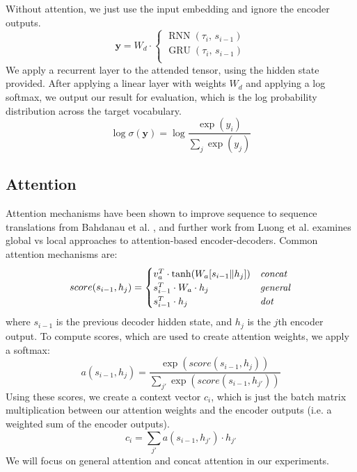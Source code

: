 \documentclass[twoside,twocolumn]{article}
\begin{document}
Without attention, we just use the input embedding and ignore the encoder
outputs.
\begin{equation}
  \mathbf{y} = W_d \cdot \begin{cases}
      \operatorname{RNN} (\tau_i, \, s_{i-1}) \\
      \operatorname{GRU} (\tau_i, \, s_{i-1}) \\
    \end{cases}
\end{equation}
We apply a recurrent layer to the attended tensor, using the hidden state
provided. After applying a linear layer with weights $W_d$ and applying a log
softmax, we output our result for evaluation, which is the log probability
distribution across the target vocabulary.
\begin{equation}
  \log \sigma(\mathbf{y}) = \log \frac{\exp(y_i)}{\sum_j \exp(y_j)}
\end{equation}
\subsection{Attention}
Attention mechanisms have been shown to improve sequence to sequence
translations from Bahdanau et al. \cite{bahdanau2014neural}, and further work
from Luong et al. \cite{luong2015effective} examines global vs local approaches
to attention-based encoder-decoders. Common attention mechanisms are:
\begin{equation}
    score(s_{i-1}, h_j) =
    \begin{cases}
        v_a^T \cdot \tanh (W_a [s_{i-1} \| h_j]) & \text{\emph{concat}} \\
        s_{i-1}^T \cdot W_a \cdot h_j & \text{\emph{general}} \\
        s_{i-1}^T \cdot h_j & \text{\emph{dot}} \\
    \end{cases}
\end{equation}
where $s_{i-1}$ is the previous decoder hidden state, and $h_j$ is the $j$th
encoder output.
To compute scores, which are used to create attention weights, we apply a
softmax:
\begin{equation}
  a(s_{i-1}, h_j) = \frac{\exp(score(s_{i-1}, h_j))}{\sum_{j'}\exp(score(s_{i-1}, h_{j'}))}
\end{equation}
Using these scores, we create a context vector $c_i$, which is just the batch
matrix multiplication between our attention weights and the encoder outputs
(i.e. a weighted sum of the encoder outputs).
\begin{equation}
  c_i = \sum_{j'} a(s_{i-1}, h_{j'}) \cdot h_{j'}
\end{equation}
We will focus on general attention and concat attention in our
experiments.
\end{document}
